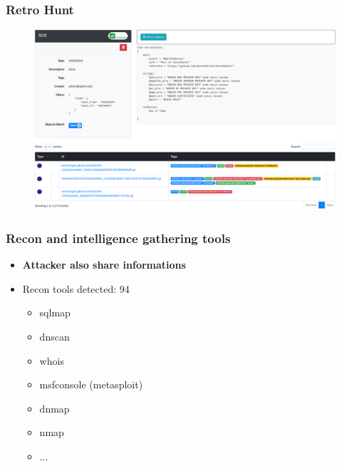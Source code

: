 \documentclass{beamer}
\begin{document}
\begin{frame}
    \frametitle{Retro Hunt}
        \begin{figure}
            \includegraphics[scale=0.22]{screenshot/retro_hunt.png}
        \end{figure}
\end{frame}

\begin{frame}
    \frametitle{Recon and intelligence gathering tools}
        \begin{itemize}
            \item {\bf Attacker also share informations}
            \item Recon tools detected: 94
            \begin{itemize}
            	\item sqlmap
            	\item dnscan
            	\item whois
            	\item msfconsole (metasploit)
            	\item dnmap
            	\item nmap
            	\item ...
            \end{itemize}
        \end{itemize}
\end{frame}
\end{document}
